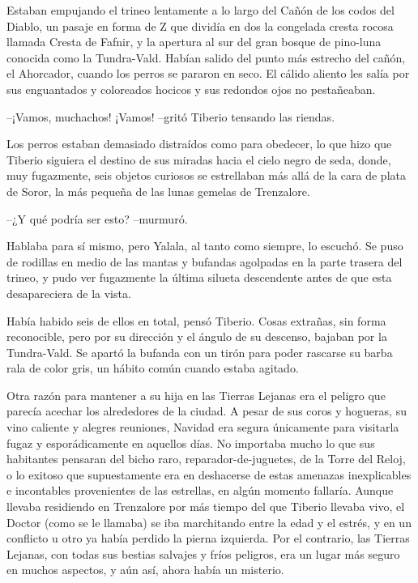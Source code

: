 Estaban empujando el trineo lentamente a lo largo del Cañón de los codos del Diablo, un pasaje en forma de Z que dividía en dos la congelada cresta rocosa llamada Cresta de Fafnir, y la apertura al sur del gran bosque de pino-luna conocida como la Tundra-Vald. Habían salido del punto más estrecho del cañón, el Ahorcador, cuando los perros se pararon en seco. El cálido aliento les salía por sus enguantados y coloreados hocicos y sus redondos ojos no pestañeaban.
 
--¡Vamos, muchachos! ¡Vamos! --gritó Tiberio tensando las riendas.
 
Los perros estaban demasiado distraídos como para obedecer, lo que hizo que Tiberio siguiera el destino de sus miradas hacia el cielo negro de seda, donde, muy fugazmente, seis objetos curiosos se estrellaban más allá de la cara de plata de Soror, la más pequeña de las lunas gemelas de Trenzalore.
 
--¿Y qué podría ser esto? --murmuró.
 
Hablaba para sí mismo, pero Yalala, al tanto como siempre, lo escuchó. Se puso de rodillas en medio de las mantas y bufandas agolpadas en la parte trasera del trineo, y pudo ver fugazmente la última silueta descendente antes de que esta desapareciera de la vista.
 
Había habido seis de ellos en total, pensó Tiberio. Cosas extrañas, sin forma reconocible, pero por su dirección y el ángulo de su descenso, bajaban por la Tundra-Vald. Se apartó la bufanda con un tirón para poder rascarse su barba rala de color gris, un hábito común cuando estaba agitado.
 
Otra razón para mantener a su hija en las Tierras Lejanas era el peligro que parecía acechar los alrededores de la ciudad. A pesar de sus coros y hogueras, su vino caliente y alegres reuniones, Navidad era segura únicamente para visitarla fugaz y esporádicamente en aquellos días. No importaba mucho lo que sus habitantes pensaran del bicho raro, reparador-de-juguetes, de la Torre del Reloj, o lo exitoso que supuestamente era en deshacerse de estas amenazas inexplicables e incontables provenientes de las estrellas, en algún momento fallaría. Aunque llevaba residiendo en Trenzalore por más tiempo del que Tiberio llevaba vivo, el Doctor (como se le llamaba) se iba marchitando entre la edad y el estrés, y en un conflicto u otro ya había perdido la pierna izquierda. Por el contrario, las Tierras Lejanas, con todas sus bestias salvajes y fríos peligros, era un lugar más seguro en muchos aspectos, y aún así, ahora había un misterio.
 

